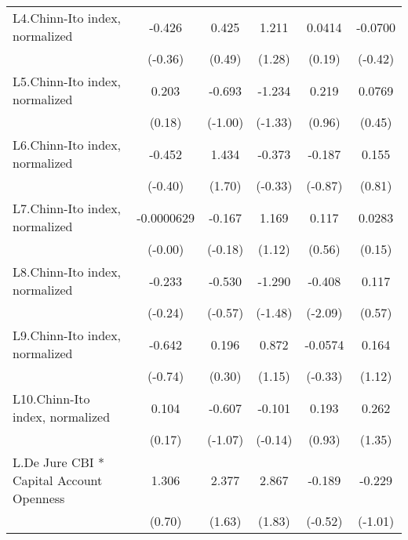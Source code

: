 {\begin{longtable}{l*{5}{c}}
L4.Chinn-Ito index, normalized&   -0.426         &    0.425         &    1.211         &   0.0414         &  -0.0700         \\
                &  (-0.36)         &   (0.49)         &   (1.28)         &   (0.19)         &  (-0.42)         \\
[1em]
L5.Chinn-Ito index, normalized&    0.203         &   -0.693         &   -1.234         &    0.219         &   0.0769         \\
                &   (0.18)         &  (-1.00)         &  (-1.33)         &   (0.96)         &   (0.45)         \\
[1em]
L6.Chinn-Ito index, normalized&   -0.452         &    1.434         &   -0.373         &   -0.187         &    0.155         \\
                &  (-0.40)         &   (1.70)         &  (-0.33)         &  (-0.87)         &   (0.81)         \\
[1em]
L7.Chinn-Ito index, normalized&-0.0000629         &   -0.167         &    1.169         &    0.117         &   0.0283         \\
                &  (-0.00)         &  (-0.18)         &   (1.12)         &   (0.56)         &   (0.15)         \\
[1em]
L8.Chinn-Ito index, normalized&   -0.233         &   -0.530         &   -1.290         &   -0.408\sym{*}  &    0.117         \\
                &  (-0.24)         &  (-0.57)         &  (-1.48)         &  (-2.09)         &   (0.57)         \\
[1em]
L9.Chinn-Ito index, normalized&   -0.642         &    0.196         &    0.872         &  -0.0574         &    0.164         \\
                &  (-0.74)         &   (0.30)         &   (1.15)         &  (-0.33)         &   (1.12)         \\
[1em]
L10.Chinn-Ito index, normalized&    0.104         &   -0.607         &   -0.101         &    0.193         &    0.262         \\
                &   (0.17)         &  (-1.07)         &  (-0.14)         &   (0.93)         &   (1.35)         \\
[1em]
L.De Jure CBI * Capital Account Openness&    1.306         &    2.377         &    2.867         &   -0.189         &   -0.229         \\
                &   (0.70)         &   (1.63)         &   (1.83)         &  (-0.52)         &  (-1.01)         \\

\end{longtable}}
